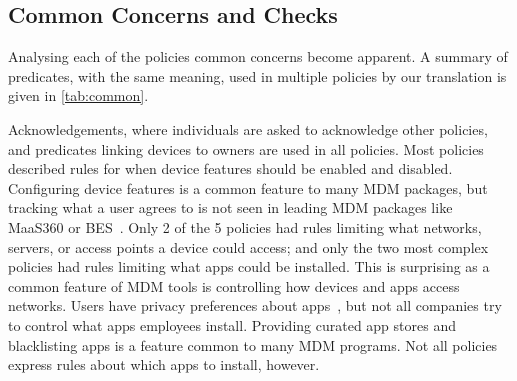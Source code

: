 \documentclass[thesis.tex]{subfiles}
\begin{document}
\subsection{Common Concerns and Checks}
\label{sec:common_concerns}

Analysing each of the policies common concerns become apparent.
A summary of predicates, with the same meaning, used in multiple policies by our translation is given in \autoref{tab:common}.

Acknowledgements, where individuals are asked to acknowledge other policies, and predicates linking devices to owners are used in all policies.
Most policies described rules for when device features should be enabled and disabled.
Configuring device features is a common feature to many MDM packages, but tracking what a user agrees to is not seen in leading MDM packages like MaaS360 or BES~\cite{rob_smith_magic_2016}.
Only 2 of the 5 policies had rules limiting what networks, servers, or access points a device could access;
  and only the two most complex policies had rules limiting what apps could be installed.
This is surprising as a common feature of MDM tools is controlling how devices and apps access networks.
Users have privacy preferences about apps~\cite{lin_modeling_2014}, but not all companies try to control what apps employees install.
Providing curated app stores and blacklisting apps is a feature common to many MDM programs.
Not all policies express rules about which apps to install, however.
\end{document}
